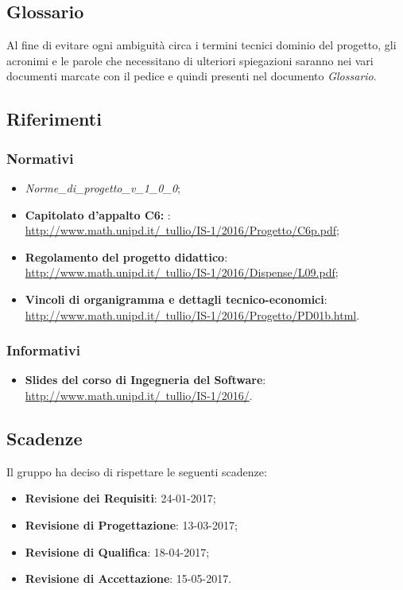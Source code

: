	\subsection{Glossario}
	Al fine di evitare ogni ambiguità circa i termini tecnici dominio del progetto, gli acronimi e le parole che necessitano di ulteriori spiegazioni 
	saranno nei vari documenti marcate con il pedice \gloss{} e quindi presenti nel documento \textit{Glossario}.
	\subsection{Riferimenti}
		\subsubsection{Normativi}
		\begin{itemize}
			\item \textit{Norme_di_progetto_v_1_0_0};
			\item \textbf{Capitolato d'appalto C6: \proj}:
			\\ \href{http://www.math.unipd.it/~tullio/IS-1/2016/Progetto/C6p.pdf}{http://www.math.unipd.it/~tullio/IS-1/2016/Progetto/C6p.pdf};
			\item \textbf{Regolamento del progetto didattico}:
			\\ \href{http://www.math.unipd.it/~tullio/IS-1/2016/Dispense/L09.pdf}{http://www.math.unipd.it/~tullio/IS-1/2016/Dispense/L09.pdf};
			\item \textbf{Vincoli di organigramma e dettagli tecnico-economici}:
			\\ \href{http://www.math.unipd.it/~tullio/IS-1/2016/Progetto/PD01b.html}{http://www.math.unipd.it/~tullio/IS-1/2016/Progetto/PD01b.html}.
			\
		\end{itemize}
		\subsubsection{Informativi}
		\begin{itemize}
			\item \textbf{Slides del corso di Ingegneria del Software}:
			\\ \href{http://www.math.unipd.it/~tullio/IS-1/2016/}{http://www.math.unipd.it/~tullio/IS-1/2016/}.
		\end{itemize}

	\subsection{Scadenze}
	Il gruppo \hx ha deciso di rispettare le seguenti scadenze:
		\begin{itemize}
			\item \textbf{Revisione dei Requisiti}: 24-01-2017;
			\item \textbf{Revisione di Progettazione}: 13-03-2017;
			\item \textbf{Revisione di Qualifica}: 18-04-2017;
			\item \textbf{Revisione di Accettazione}: 15-05-2017.
		\end{itemize}


